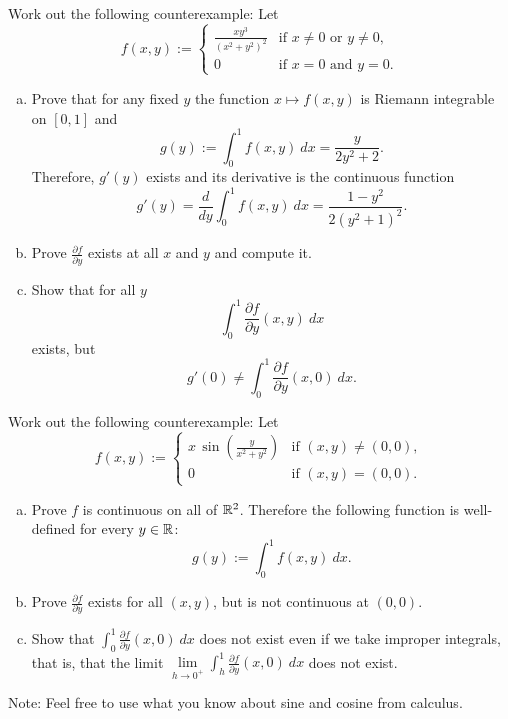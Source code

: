 \begin{exercise}
Work out the following counterexample:  Let
\begin{equation*}
f(x,y) :=
\begin{cases}
\frac{xy^3}{{(x^2+y^2)}^2} & \text{if } x\not=0 \text{ or } y\not= 0, \\
0                          & \text{if } x=0 \text{ and } y=0.
\end{cases}
\end{equation*}
\begin{enumerate}[a)]
\item
Prove that for any fixed $y$ the function $x \mapsto f(x,y)$ is
Riemann integrable on $[0,1]$ and
\begin{equation*}
g(y) := \int_0^1 f(x,y) ~ dx = \frac{y}{2y^2+2} .
\end{equation*}
Therefore, $g'(y)$ exists and its derivative is the continuous function
\begin{equation*}
g'(y) =
\frac{d}{dy} \int_0^1 f(x,y) ~ dx
=
\frac{1-y^2}{2{(y^2+1)}^2} .
\end{equation*}
\item
Prove $\frac{\partial f}{\partial y}$ exists at all $x$ and $y$ and
compute it.
\item
Show that for all $y$
\begin{equation*}
\int_0^1 \frac{\partial f}{\partial y} (x,y) ~ dx
\end{equation*}
exists, but
\begin{equation*}
g'(0) \not= \int_0^1 \frac{\partial f}{\partial y} (x,0) ~ dx .
\end{equation*}
\end{enumerate}
\end{exercise}

\pagebreak[2]
\begin{exercise}
Work out the following counterexample:  Let
\begin{equation*}
f(x,y) :=
\begin{cases}
x \,\sin \left(\frac{y}{x^2+y^2}\right) & \text{if } (x,y) \not= (0,0),\\
0                                       & \text{if } (x,y)=(0,0).
\end{cases}
\end{equation*}
\begin{enumerate}[a)]
\item
Prove $f$ is continuous on all of ${\mathbb{R}}^2$.
Therefore the following function is well-defined for every $y \in {\mathbb{R}}$:
\begin{equation*}
g(y) := \int_0^1 f(x,y) ~ dx .
\end{equation*}
\item
Prove $\frac{\partial f}{\partial y}$ exists for all $(x,y)$,
but is not continuous at $(0,0)$.
\item
Show that $\int_0^1 \frac{\partial f}{\partial y}(x,0) ~ dx$ does not
exist even if we take improper integrals, that is,
that the limit
$\lim\limits_{h \to 0^+} \int_h^1 \frac{\partial f}{\partial y}(x,0) ~ dx$
does not exist.
\end{enumerate}
Note: Feel free to use what you know about sine and cosine from calculus.
\end{exercise}

